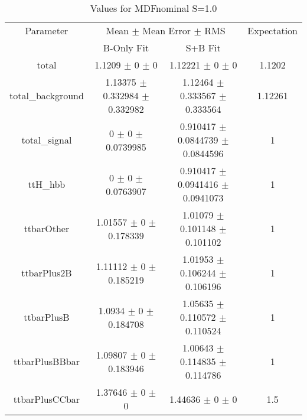 \begin{table}
\centering
\caption{Values for MDFnominal S=1.0}
\begin{tabular}{cccc}
\toprule
Parameter & \multicolumn{2}{c}{Mean $\pm$ Mean Error $\pm$ RMS} & Expectation\\
 & B-Only Fit & S+B Fit & \\
\midrule
total & \num{1.1209} $\pm$ \num{0} $\pm$ \num{0} & \num{1.12221} $\pm$ \num{0} $\pm$ \num{0} & \num{1.1202}\\
total\_background & \num{1.13375} $\pm$ \num{0.332984} $\pm$ \num{0.332982} & \num{1.12464} $\pm$ \num{0.333567} $\pm$ \num{0.333564} & \num{1.12261}\\
total\_signal & \num{0} $\pm$ \num{0} $\pm$ \num{0.0739985} & \num{0.910417} $\pm$ \num{0.0844739} $\pm$ \num{0.0844596} & \num{1}\\
ttH\_hbb & \num{0} $\pm$ \num{0} $\pm$ \num{0.0763907} & \num{0.910417} $\pm$ \num{0.0941416} $\pm$ \num{0.0941073} & \num{1}\\
ttbarOther & \num{1.01557} $\pm$ \num{0} $\pm$ \num{0.178339} & \num{1.01079} $\pm$ \num{0.101148} $\pm$ \num{0.101102} & \num{1}\\
ttbarPlus2B & \num{1.11112} $\pm$ \num{0} $\pm$ \num{0.185219} & \num{1.01953} $\pm$ \num{0.106244} $\pm$ \num{0.106196} & \num{1}\\
ttbarPlusB & \num{1.0934} $\pm$ \num{0} $\pm$ \num{0.184708} & \num{1.05635} $\pm$ \num{0.110572} $\pm$ \num{0.110524} & \num{1}\\
ttbarPlusBBbar & \num{1.09807} $\pm$ \num{0} $\pm$ \num{0.183946} & \num{1.00643} $\pm$ \num{0.114835} $\pm$ \num{0.114786} & \num{1}\\
ttbarPlusCCbar & \num{1.37646} $\pm$ \num{0} $\pm$ \num{0} & \num{1.44636} $\pm$ \num{0} $\pm$ \num{0} & \num{1.5}\\
\bottomrule
\end{tabular}
\end{table}